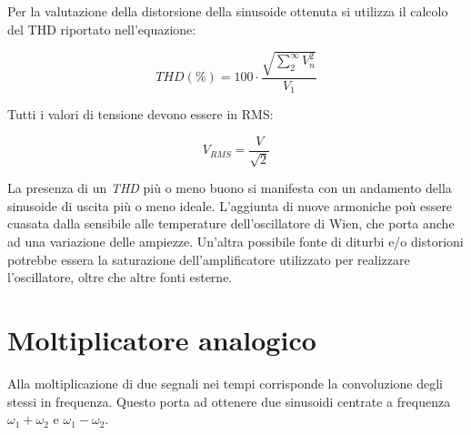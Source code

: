 \documentclass[titlepage]{report}
\begin{document}
	Per la valutazione della distorsione della sinusoide ottenuta si utilizza il calcolo del THD riportato nell'equazione:
	
	\begin{equation}
		\label{eq:thd}
		THD (\%) = 100 \cdot \frac{\sqrt{\sum_{2}^{\infty} V_{n}^2}}{V_1}
	\end{equation}

	Tutti i valori di tensione devono essere in RMS: 
	
	\begin{equation}
		\label{eq:Vrms}
		V_{RMS} = \frac{V}{\sqrt{2}}
	\end{equation}

	La presenza di un \textit{THD} più o meno buono si manifesta con un andamento della sinusoide di uscita più o meno ideale. L'aggiunta di nuove armoniche poù essere cuasata dalla sensibile alle temperature dell'oscillatore di Wien, che porta anche ad una variazione delle ampiezze. Un'altra possibile fonte di diturbi e/o distorioni potrebbe essera la saturazione dell'amplificatore utilizzato per realizzare l'oscillatore, oltre che altre fonti esterne.


	
	
		
\newpage
\section{Moltiplicatore analogico}
	Alla moltiplicazione di due segnali nei tempi corrisponde la convoluzione degli stessi in frequenza. Questo porta ad ottenere due sinusoidi centrate a frequenza $\omega_1 + \omega_2$ e $\omega_1 - \omega_2$.
	
\end{document}
